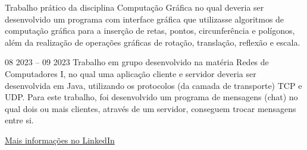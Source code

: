 Trabalho prático da disciplina Computação Gráfica no qual deveria ser desenvolvido um programa com interface gráfica que utilizasse algoritmos de computação gráfica para a inserção de retas, pontos, circunferência e polígonos, além da realização de operações gráficas de rotação, translação, reflexão e escala.\\
\divider

{
}{08 2023 -- 09 2023}{}
Trabalho em grupo desenvolvido na matéria Redes de Computadores I, no qual uma aplicação cliente e servidor deveria ser desenvolvida em Java, utilizando os protocolos (da camada de transporte) TCP e UDP. Para este trabalho, foi desenvolvido um programa de mensagens (chat) no qual dois ou mais clientes, através de um servidor, conseguem trocar mensagens entre si.\\
\divider

{\large\color{emphasis}\href{https://www.linkedin.com/in/henriquemcc/details/projects/}{Mais informações no LinkedIn}}